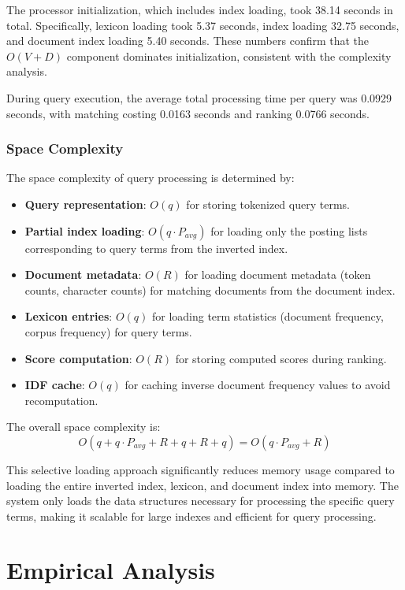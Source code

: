\documentclass[sigconf]{acmart}
\begin{document}
The processor initialization, which includes index loading, took 38.14 seconds in total. Specifically, lexicon loading took 5.37 seconds, index loading 32.75 seconds, and document index loading 5.40 seconds. These numbers confirm that the $O(V + D)$ component dominates initialization, consistent with the complexity analysis.

During query execution, the average total processing time per query was 0.0929 seconds, with matching costing 0.0163 seconds and ranking 0.0766 seconds. 


\subsubsection{Space Complexity}
The space complexity of query processing is determined by:

\begin{itemize}
    \item \textbf{Query representation}: $O(q)$ for storing tokenized query terms.
    \item \textbf{Partial index loading}: $O(q \cdot P_{avg})$ for loading only the posting lists corresponding to query terms from the inverted index.
    \item \textbf{Document metadata}: $O(R)$ for loading document metadata (token counts, character counts) for matching documents from the document index.
    \item \textbf{Lexicon entries}: $O(q)$ for loading term statistics (document frequency, corpus frequency) for query terms.
    \item \textbf{Score computation}: $O(R)$ for storing computed scores during ranking.
    \item \textbf{IDF cache}: $O(q)$ for caching inverse document frequency values to avoid recomputation.
\end{itemize}

The overall space complexity is:
\[
O(q + q \cdot P_{avg} + R + q + R + q) = O(q \cdot P_{avg} + R)
\]

This selective loading approach significantly reduces memory usage compared to loading the entire inverted index, lexicon, and document index into memory. The system only loads the data structures necessary for processing the specific query terms, making it scalable for large indexes and efficient for query processing.
\section{Empirical Analysis}
\end{document}
